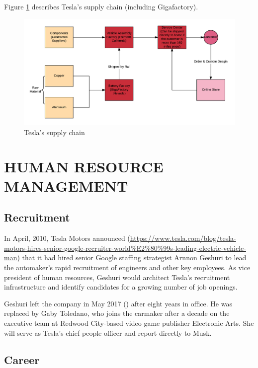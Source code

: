 \documentclass[12pt]{article}
\begin{document}
Figure \ref{supplypic} describes Tesla's supply chain (including Gigafactory).

\begin{figure}
	\includegraphics[width=\textwidth]{SupplyChain.png}
	\caption{Tesla's supply chain\label{supplypic}}
\end{figure}

\section{HUMAN RESOURCE MANAGEMENT}

\subsection{Recruitment}


In April, 2010, Tesla Motors announced (\url{https://www.tesla.com/blog/tesla-motors-hires-senior-google-recruiter-world%E2%80%99s-leading-electric-vehicle-man}) that it had hired senior Google staffing strategist Arnnon Geshuri to lead the automaker's rapid recruitment of engineers and other key employees. As vice president of human resources, Geshuri would architect Tesla's recruitment infrastructure and identify candidates for a growing number of job openings.

Geshuri left the company in May 2017 (\cite{ha17}) after eight years in office. He was replaced by Gaby Toledano, who joins the carmaker after a decade on the executive team at Redwood City-based video game publisher Electronic Arts. She will serve as Tesla's chief people officer and report directly to Musk.

\subsection{Career}
\end{document}

